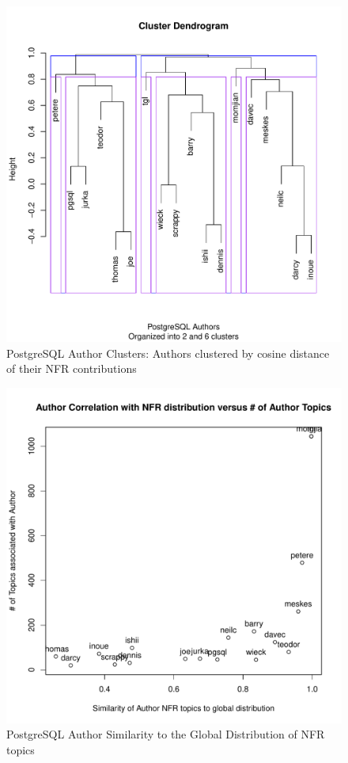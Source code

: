 \documentclass[smallextended]{svjour3}       %
\begin{document}
\begin{figure}
  \centering
  \includegraphics[width=.9\textwidth]{figures/postgresql-author-cluster}
  \caption{PostgreSQL Author Clusters: Authors clustered by cosine
    distance of their NFR contributions}
\label{fig:authorcluster}
\end{figure}




\begin{figure}
  \centering
  \includegraphics[width=.9\textwidth]{figures/author-distance-from-aggregate}
  \caption{PostgreSQL Author Similarity to the Global Distribution of NFR topics}
\label{fig:authorsim}
\end{figure}
\end{document}

